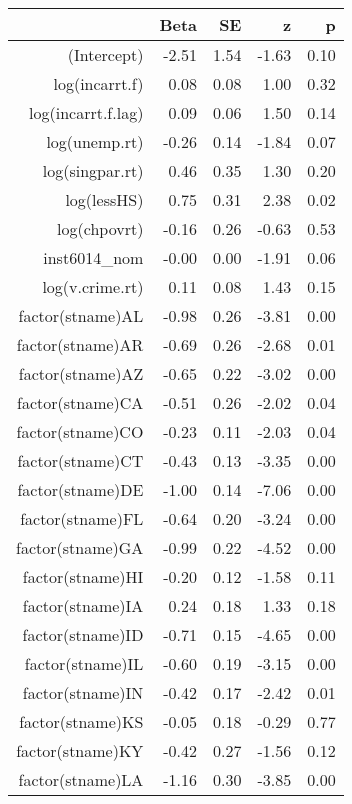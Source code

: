 \begin{table}[ht]
\centering
\begin{tabular}{rrrrr}
  \hline
 & Beta & SE & z & p \\ 
  \hline
(Intercept) & -2.51 & 1.54 & -1.63 & 0.10 \\ 
  log(incarrt.f) & 0.08 & 0.08 & 1.00 & 0.32 \\ 
  log(incarrt.f.lag) & 0.09 & 0.06 & 1.50 & 0.14 \\ 
  log(unemp.rt) & -0.26 & 0.14 & -1.84 & 0.07 \\ 
  log(singpar.rt) & 0.46 & 0.35 & 1.30 & 0.20 \\ 
  log(lessHS) & 0.75 & 0.31 & 2.38 & 0.02 \\ 
  log(chpovrt) & -0.16 & 0.26 & -0.63 & 0.53 \\ 
  inst6014\_nom & -0.00 & 0.00 & -1.91 & 0.06 \\ 
  log(v.crime.rt) & 0.11 & 0.08 & 1.43 & 0.15 \\ 
  factor(stname)AL & -0.98 & 0.26 & -3.81 & 0.00 \\ 
  factor(stname)AR & -0.69 & 0.26 & -2.68 & 0.01 \\ 
  factor(stname)AZ & -0.65 & 0.22 & -3.02 & 0.00 \\ 
  factor(stname)CA & -0.51 & 0.26 & -2.02 & 0.04 \\ 
  factor(stname)CO & -0.23 & 0.11 & -2.03 & 0.04 \\ 
  factor(stname)CT & -0.43 & 0.13 & -3.35 & 0.00 \\ 
  factor(stname)DE & -1.00 & 0.14 & -7.06 & 0.00 \\ 
  factor(stname)FL & -0.64 & 0.20 & -3.24 & 0.00 \\ 
  factor(stname)GA & -0.99 & 0.22 & -4.52 & 0.00 \\ 
  factor(stname)HI & -0.20 & 0.12 & -1.58 & 0.11 \\ 
  factor(stname)IA & 0.24 & 0.18 & 1.33 & 0.18 \\ 
  factor(stname)ID & -0.71 & 0.15 & -4.65 & 0.00 \\ 
  factor(stname)IL & -0.60 & 0.19 & -3.15 & 0.00 \\ 
  factor(stname)IN & -0.42 & 0.17 & -2.42 & 0.01 \\ 
  factor(stname)KS & -0.05 & 0.18 & -0.29 & 0.77 \\ 
  factor(stname)KY & -0.42 & 0.27 & -1.56 & 0.12 \\ 
  factor(stname)LA & -1.16 & 0.30 & -3.85 & 0.00 \\ 

\end{tabular}
\end{table}
